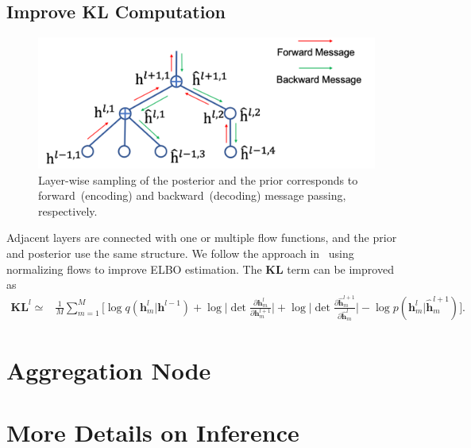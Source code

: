 \documentclass{article}
\begin{document}
\vspace{-0.1in}
\subsection{Improve KL Computation}
 

\begin{figure}[H]
\begin{center}
 \includegraphics[width=0.6\linewidth]{fig/message.png}
\end{center}
\vspace{-0.2in}
\caption{ {\small  Layer-wise sampling of the posterior and the prior corresponds to forward~(encoding) and backward~(decoding) message passing, respectively.}}
\label{fig:message}
\vspace{-0.15in}
\end{figure}

Adjacent layers are connected with one or multiple flow functions, and the prior and posterior use the same structure.  We follow the approach in~\cite{rezende2015variational,berg2018sylvester}  using normalizing flows to improve ELBO estimation. The $\mathbf{KL}$ term can be improved as
\begin{align} \label{eq:kl_est}
\mathbf{KL}^l
\simeq & \frac{1}{M}\sum_{m=1}^M\bigg[ \log q(\mathbf{h}^{l}_m|\mathbf{h}^{l-1}) +\log \bigg|\det \frac{\partial \mathbf{h}^{l}_m}{\partial \mathbf{h}^{l+1}_m}\bigg| + \log \bigg|\det \frac{\partial \widehat{\mathbf{h}}^{l+1}_m}{\partial \widehat{\mathbf{h}}^{l}_m}\bigg|   - \log p(\mathbf{h}^{l}_m|\widehat{\mathbf{h}}_m^{l+1}) \bigg].
\end{align}

\section{Aggregation Node}

\section{More Details on Inference}
\end{document}
